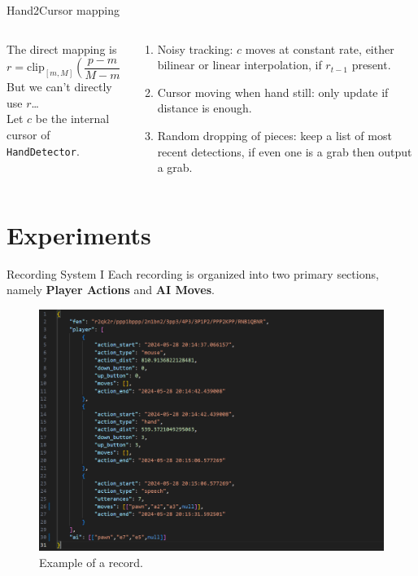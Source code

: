 \documentclass[english]{beamer}
\begin{document}
\begin{frame}{Hand2Cursor mapping}
    \begin{columns}
        \begin{column}{.5\textwidth}
            The direct mapping is
            \begin{equation}
                r = \mathrm{clip}_{[m,M]}(\frac{p - m}{M - m}).
            \end{equation}
            But we can't directly use $r$\dots\\
            Let $c$ be the internal cursor of \texttt{HandDetector}.
        \end{column}
        \begin{column}{.5\textwidth}
            \begin{enumerate}
                \item Noisy tracking: $c$ moves at constant rate, either bilinear or linear interpolation, if $r_{t-1}$ present.
                \item Cursor moving when hand still: only update if distance is enough.
                \item Random dropping of pieces: keep a list of most recent detections, if even one is a grab then output a grab.
            \end{enumerate}
        \end{column}
    \end{columns}
\end{frame}


\section{Experiments}
\begin{frame}{Recording System I}
    Each recording is organized into two primary sections, namely \textbf{Player Actions} and \textbf{AI Moves}.
    \begin{figure}
        \centering
        \includegraphics[width=.65\textwidth]{images/example_record2.png}
        \caption{Example of a record.}
    \end{figure}
\end{frame}
\end{document}
